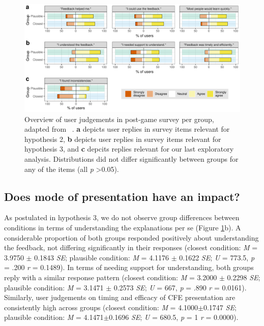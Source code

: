 \begin{figure}
   \centering
   \includegraphics[width=\textwidth]{./media/H2_H3_expl_survey_T_PAZ_FINAL.pdf}
   \caption{Overview of user judgements in post-game survey per group, adapted from ~\citep{holzinger_measuring_2020}. \textbf{a} depicts user replies in survey items relevant for hypothesis 2, \textbf{b} depicts user replies in survey items relevant for hypothesis 3, and \textbf{c} depcits replies relevant for our last exploratory analysis. Distributions did not differ significantly between groups for any of the items (all \textit{p} \textgreater 0.05).}
   \label{fig:survey}
 \end{figure}

\subsection{Does mode of presentation have an impact?}
As postulated in hypothesis 3, we do not observe group differences between conditions in terms of understanding the explanations per se (Figure \ref{fig:survey}b). 
A considerable proportion of both groups responded positively about understanding the feedback, not differing significantly in their responses (closest condition: \textit{M} = 3.9750 $\pm$ 0.1843 \textit{SE}; plausible condition: \textit{M} = 4.1176 $\pm$ 0.1622 \textit{SE}; \textit{U} = 773.5, \textit{p} = .200 \textit{r} = 0.1489).
In terms of needing support for understanding, both groups reply with a similar response pattern (closest condition: \textit{M} = 3.2000 $\pm$ 0.2298 \textit{SE}; plausible condition: \textit{M} = 3.1471 $\pm$ 0.2573 \textit{SE}; \textit{U} = 667, \textit{p} = .890 \textit{r} = 0.0161).
Similarly, user judgements on timing and efficacy of  CFE presentation are consistently high across groups (closest condition: \textit{M} = 4.1000$\pm$0.1747 \textit{SE}; plausible condition: \textit{M} = 4.1471$\pm$0.1696 \textit{SE}; \textit{U} = 680.5, \textit{p} = 1 \textit{r} = 0.0000).

